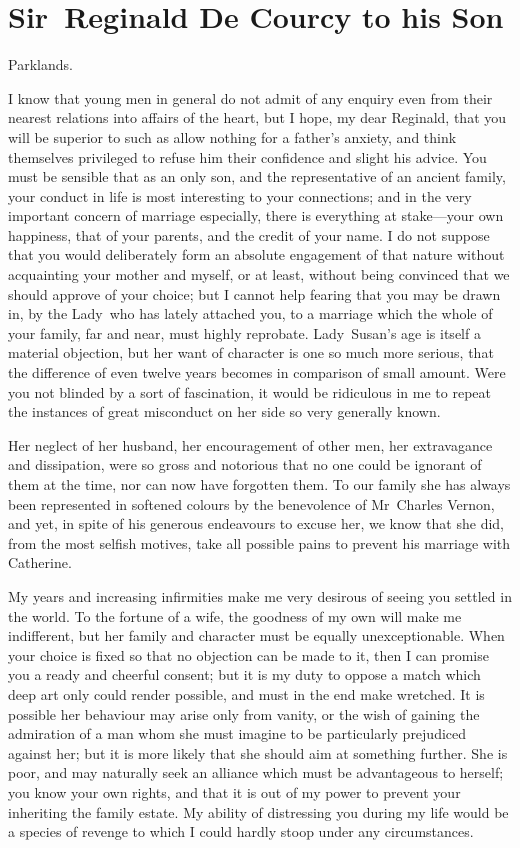 \chapter{Sir~Reginald De Courcy to his Son}
  
  \begin{mail}{Parklands.}{}

I know that young men in general do not admit of any enquiry even from their nearest relations into affairs of the heart, but I hope, my dear Reginald, that you will be superior to such as allow nothing for a father's anxiety, and think themselves privileged to refuse him their confidence and slight his advice. You must be sensible that as an only son, and the representative of an ancient family, your conduct in life is most interesting to your connections; and in the very important concern of marriage especially, there is everything at stake—your own happiness, that of your parents, and the credit of your name. I do not suppose that you would deliberately form an absolute engagement of that nature without acquainting your mother and myself, or at least, without being convinced that we should approve of your choice; but I cannot help fearing that you may be drawn in, by the Lady~who has lately attached you, to a marriage which the whole of your family, far and near, must highly reprobate. Lady~Susan's age is itself a material objection, but her want of character is one so much more serious, that the difference of even twelve years becomes in comparison of small amount. Were you not blinded by a sort of fascination, it would be ridiculous in me to repeat the instances of great misconduct on her side so very generally known.

Her neglect of her husband, her encouragement of other men, her extravagance and dissipation, were so gross and notorious that no one could be ignorant of them at the time, nor can now have forgotten them. To our family she has always been represented in softened colours by the benevolence of Mr~Charles Vernon, and yet, in spite of his generous endeavours to excuse her, we know that she did, from the most selfish motives, take all possible pains to prevent his marriage with Catherine.

My years and increasing infirmities make me very desirous of seeing you settled in the world. To the fortune of a wife, the goodness of my own will make me indifferent, but her family and character must be equally unexceptionable. When your choice is fixed so that no objection can be made to it, then I can promise you a ready and cheerful consent; but it is my duty to oppose a match which deep art only could render possible, and must in the end make wretched. It is possible her behaviour may arise only from vanity, or the wish of gaining the admiration of a man whom she must imagine to be particularly prejudiced against her; but it is more likely that she should aim at something further. She is poor, and may naturally seek an alliance which must be advantageous to herself; you know your own rights, and that it is out of my power to prevent your inheriting the family estate. My ability of distressing you during my life would be a species of revenge to which I could hardly stoop under any circumstances.


\end{mail}
